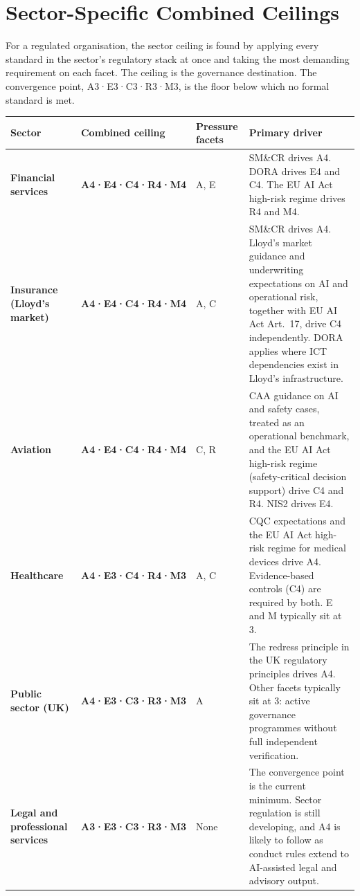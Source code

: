 \section{Sector-Specific Combined Ceilings}

For a regulated organisation, the sector ceiling is found by applying every standard in the sector's regulatory stack at once and taking the most demanding requirement on each facet. The ceiling is the governance destination. The convergence point, A3·E3·C3·R3·M3, is the floor below which no formal standard is met.

\begingroup
\small
\begin{longtable}[]{@{}
  >{\raggedright\arraybackslash}p{}
  >{\raggedright\arraybackslash}p{}
  >{\raggedright\arraybackslash}p{}
  >{\raggedright\arraybackslash}p{}@{}}
\toprule\noalign{}
\textbf{Sector} & \textbf{Combined ceiling} & \textbf{Pressure facets} & \textbf{Primary driver} \\
\midrule\noalign{}
\endhead
\bottomrule\noalign{}
\endlastfoot
\textbf{Financial services} & \textbf{A4·E4·C4·R4·M4} & A, E & SM\&CR drives A4. DORA drives E4 and C4. The EU AI Act high-risk regime drives R4 and M4. \\
\textbf{Insurance (Lloyd's market)} & \textbf{A4·E4·C4·R4·M4} & A, C & SM\&CR drives A4. Lloyd's market guidance and underwriting expectations on AI and operational risk, together with EU AI Act Art.\ 17, drive C4 independently. DORA applies where ICT dependencies exist in Lloyd's infrastructure. \\
\textbf{Aviation} & \textbf{A4·E4·C4·R4·M4} & C, R & CAA guidance on AI and safety cases, treated as an operational benchmark, and the EU AI Act high-risk regime (safety-critical decision support) drive C4 and R4. NIS2 drives E4. \\
\textbf{Healthcare} & \textbf{A4·E3·C4·R4·M3} & A, C & CQC expectations and the EU AI Act high-risk regime for medical devices drive A4. Evidence-based controls (C4) are required by both. E and M typically sit at 3. \\
\textbf{Public sector (UK)} & \textbf{A4·E3·C3·R3·M3} & A & The redress principle in the UK regulatory principles drives A4. Other facets typically sit at 3: active governance programmes without full independent verification. \\
\textbf{Legal and professional services} & \textbf{A3·E3·C3·R3·M3} & None & The convergence point is the current minimum. Sector regulation is still developing, and A4 is likely to follow as conduct rules extend to AI-assisted legal and advisory output. \\
\end{longtable}
\endgroup

